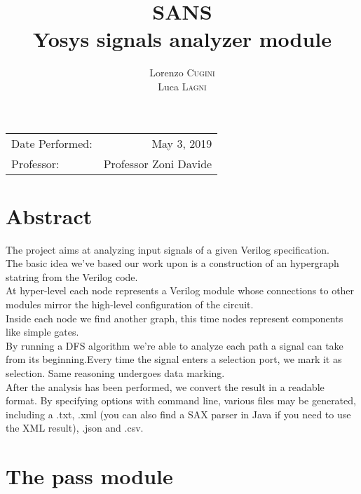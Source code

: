 \documentclass{article}
\title{SANS \\Yosys signals analyzer module \\} %
\author{Lorenzo \textsc{Cugini} \\ Luca \textsc{Lagni}} %
\begin{document}
\maketitle %

\begin{center}
\begin{tabular}{l r}
Date Performed: & May 3, 2019 \\ %
Professor: & Professor Zoni Davide %
\end{tabular}
\end{center}


\section{Abstract}

The project aims at analyzing input signals of a given Verilog specification. \\

The basic idea we've based our work upon is a construction of an hypergraph statring from the Verilog code.\\
At hyper-level each node represents a Verilog module whose connections to other modules mirror the high-level configuration of the circuit.\\
Inside each node we find another graph, this time nodes represent components like simple gates.\\
By running a DFS algorithm we're able to analyze each path a signal can take from its beginning.Every time the signal enters a selection port, we mark it as selection. Same reasoning undergoes data marking.\\
After the analysis has been performed, we convert the result in a readable format. By specifying options with command line, various files may be generated, including a .txt, .xml (you can also find a SAX parser in Java if you need to use the XML result), .json and .csv.\\


\section{The pass module}
\end{document}
